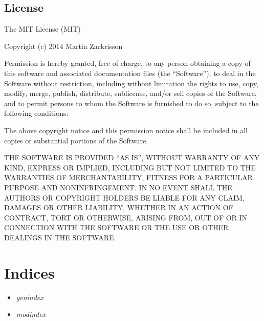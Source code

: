 \documentclass[letterpaper,10pt,english]{sphinxmanual}
\begin{document}
\begin{itemize}
\begin{quote}
{\hyperref[fseq.reporting:fseq.reporting.report_builder.ReportBuilderBase]{}}
\begin{quote}

{\hyperref[fseq.reporting:fseq.reporting.report_builder.ReportBuilderFFT]{}}

{\hyperref[fseq.reporting:fseq.reporting.report_builder.ReportBuilderPositionAverage]{}}
\end{quote}
\end{quote}

\end{itemize}


\section{License}
\label{license::doc}\label{license:license}
The MIT License (MIT)

Copyright (c) 2014 Martin Zackrisson

Permission is hereby granted, free of charge, to any person obtaining a copy
of this software and associated documentation files (the ``Software''), to deal
in the Software without restriction, including without limitation the rights
to use, copy, modify, merge, publish, distribute, sublicense, and/or sell
copies of the Software, and to permit persons to whom the Software is
furnished to do so, subject to the following conditions:

The above copyright notice and this permission notice shall be included in
all copies or substantial portions of the Software.

THE SOFTWARE IS PROVIDED ``AS IS'', WITHOUT WARRANTY OF ANY KIND, EXPRESS OR
IMPLIED, INCLUDING BUT NOT LIMITED TO THE WARRANTIES OF MERCHANTABILITY,
FITNESS FOR A PARTICULAR PURPOSE AND NONINFRINGEMENT. IN NO EVENT SHALL THE
AUTHORS OR COPYRIGHT HOLDERS BE LIABLE FOR ANY CLAIM, DAMAGES OR OTHER
LIABILITY, WHETHER IN AN ACTION OF CONTRACT, TORT OR OTHERWISE, ARISING FROM,
OUT OF OR IN CONNECTION WITH THE SOFTWARE OR THE USE OR OTHER DEALINGS IN
THE SOFTWARE.


\chapter{Indices}
\label{index:indices}\begin{itemize}
\item {} 
\emph{genindex}

\item {} 
\emph{modindex}

\end{itemize}
\end{document}
